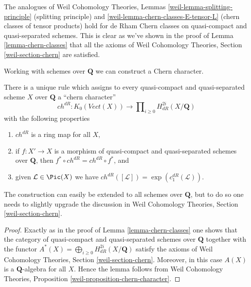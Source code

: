 \begin{remark}
\label{remark-splitting-principle}
The analogues of Weil Cohomology Theories, Lemmas
\ref{weil-lemma-splitting-principle} (splitting principle) and
\ref{weil-lemma-chern-classes-E-tensor-L} (chern classes of tensor products)
hold for de Rham Chern classes on quasi-compact and quasi-separated schemes.
This is clear as we've shown in the proof of
Lemma \ref{lemma-chern-classes}
that all the axioms of Weil Cohomology Theories, Section
\ref{weil-section-chern} are satisfied.
\end{remark}

\noindent
Working with schemes over $\mathbf{Q}$ we can construct a Chern character.

\begin{lemma}
\label{lemma-chern-character}
There is a unique rule which assigns to every quasi-compact and quasi-separated
scheme $X$ over $\mathbf{Q}$ a ``chern character''
$$
ch^{dR} : K_0(\textit{Vect}(X)) \longrightarrow
\prod\nolimits_{i \geq 0} H_{dR}^{2i}(X/\mathbf{Q})
$$
with the following properties
\begin{enumerate}
\item $ch^{dR}$ is a ring map for all $X$,
\item if $f : X' \to X$ is a morphism of quasi-compact and quasi-separated
schemes over $\mathbf{Q}$, then $f^* \circ ch^{dR} =  ch^{dR} \circ f^*$, and
\item given $\mathcal{L} \in \Pic(X)$
we have $ch^{dR}([\mathcal{L}]) = \exp(c_1^{dR}(\mathcal{L}))$.
\end{enumerate}
\end{lemma}

\noindent
The construction can easily be extended to all schemes over $\mathbf{Q}$,
but to do so one needs to slightly upgrade the discussion in
Weil Cohomology Theories, Section \ref{weil-section-chern}.

\begin{proof}
Exactly as in the proof of Lemma \ref{lemma-chern-classes}
one shows that the category of quasi-compact and quasi-separated
schemes over $\mathbf{Q}$ together with the functor
$A^*(X) = \bigoplus_{i \geq 0} H_{dR}^{2i}(X/\mathbf{Q})$
satisfy the axioms of
Weil Cohomology Theories, Section \ref{weil-section-chern}.
Moreover, in this case $A(X)$ is a $\mathbf{Q}$-algebra for
all $X$. Hence the lemma follows from
Weil Cohomology Theories, Proposition
\ref{weil-proposition-chern-character}.
\end{proof}







